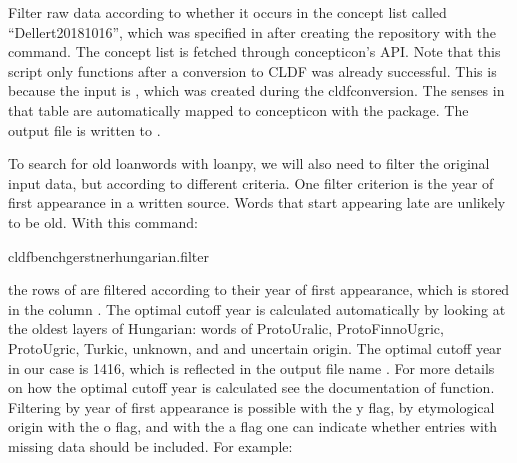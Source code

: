 \documentclass[letterpaper,10pt,english]{sphinxmanual}
\begin{document}

\begin{fulllineitems}
\label{\detokenize{filter:gerstnerhungariancommands.map.run}}
\pysigstartsignatures
{}
\pysigstopsignatures
\sphinxAtStartPar
Filter raw data according to whether it occurs in the concept list called
“Dellert\sphinxhyphen{}2018\sphinxhyphen{}1016”, which was specified in  after
creating the repository with the  command. The concept
list is fetched through concepticon’s API. Note that this script only
functions after a conversion to CLDF was already successful. This is
because the input is , which was created during the
cldf\sphinxhyphen{}conversion. The senses in that table are automatically mapped to
concepticon with the  package.
The output file is written to .

\end{fulllineitems}


\sphinxAtStartPar
To search for old loanwords with loanpy, we will also need to filter the
original input data, but according to different criteria. One filter criterion
is the year of first appearance in a written source. Words that start
appearing late are unlikely to be old. With this command:

\begin{sphinxVerbatim}[commandchars=\\\{\}]
cldfbenchgerstnerhungarian.filter
\end{sphinxVerbatim}

\sphinxAtStartPar
the rows of  are filtered according to their year of first
appearance, which is stored in the column . The optimal cut\sphinxhyphen{}off year
is calculated automatically by looking at the oldest layers of Hungarian:
words of Proto\sphinxhyphen{}Uralic, Proto\sphinxhyphen{}Finno\sphinxhyphen{}Ugric, Proto\sphinxhyphen{}Ugric, Turkic, unknown, and
and uncertain origin. The optimal cut\sphinxhyphen{}off year in our case is 1416, which
is reflected in the output file name . For more details
on how the optimal cut\sphinxhyphen{}off year is calculated see the documentation of
function. Filtering by year of first appearance is possible with the \sphinxhyphen{}y flag,
by etymological origin with the \sphinxhyphen{}o flag, and with the \sphinxhyphen{}a flag one can indicate
whether entries with missing data should be included. For example:
\end{document}
